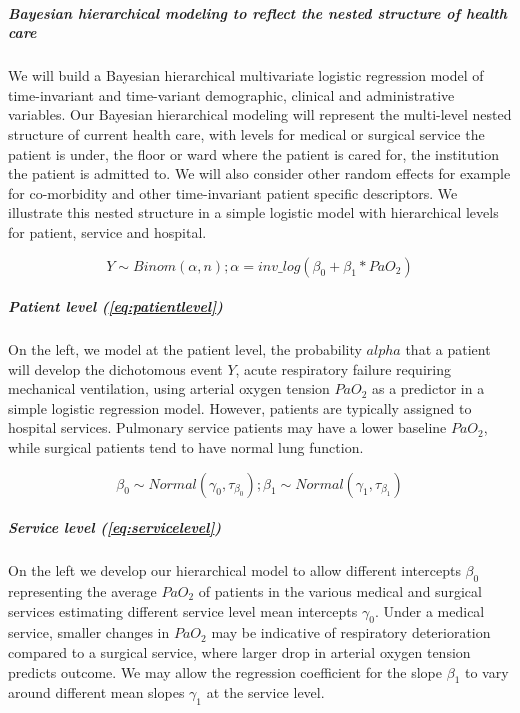 \documentclass[11pt,notitlepage]{article}
\begin{document}
\subparagraph*{Bayesian hierarchical modeling to reflect the nested structure of health care}   
We will build a Bayesian hierarchical multivariate logistic regression model of time-invariant and time-variant demographic, clinical and administrative variables. Our Bayesian hierarchical modeling will represent the multi-level nested structure of current health care, with levels for medical or surgical service the patient is under, the floor or ward where the patient is cared for, the institution the patient is admitted to. We will also consider other random effects for example for co-morbidity and other time-invariant patient specific descriptors. We illustrate this nested structure in a simple logistic model with hierarchical levels for patient, service and hospital. 

\begin{figure}
\vspace{-20pt}
 \begin{equation} \label{eq:patientlevel}
 Y \sim Binom (\alpha, n); \alpha = inv\_log (\beta_{0} +\beta_{1} * PaO_2)
 \end{equation}
\vspace{-25pt}
\end{figure}

\subparagraph*{Patient level (\ref{eq:patientlevel})}
On the left, we model at the patient level, the probability $alpha$ that a patient will develop the dichotomous event $Y$, acute respiratory failure requiring mechanical ventilation, using arterial oxygen tension $PaO_{2}$ as a predictor in a simple logistic regression model. However, patients are typically assigned to hospital services. Pulmonary service patients may have a lower baseline $PaO_2$, while surgical patients tend to have normal lung function. 

\begin{figure}
\vspace{-10pt}
\begin{equation} \label{eq:servicelevel}
 \beta_{0} \sim Normal (\gamma_0 , \tau_{\beta_0}); \beta_{1} \sim Normal (\gamma_1, \tau_{\beta_1})
\end{equation}
\vspace{-25pt}
\end{figure}

\subparagraph*{Service level (\ref{eq:servicelevel})}
On the left we develop our hierarchical model to allow different intercepts $\beta_{0}$ representing the average $PaO_2$ of patients in the various medical and surgical services estimating different service level mean intercepts $\gamma_0$. Under a medical service, smaller changes in $PaO_2$ may be indicative of respiratory deterioration compared to a surgical service, where larger drop in arterial oxygen tension predicts outcome. We may allow the regression coefficient for the slope $\beta_{1}$ to vary around different mean slopes $\gamma_1$ at the service level. 
\end{document}
